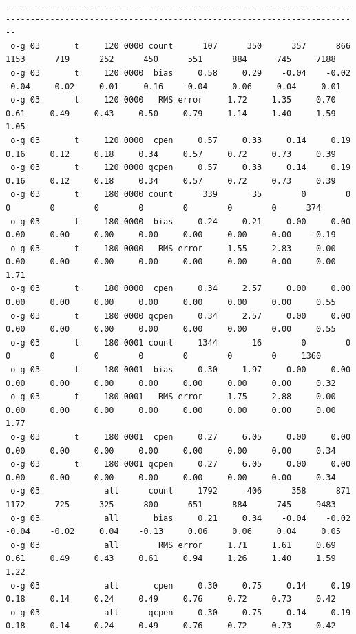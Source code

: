 \begin{itemize}[leftmargin=*]
\begin{tiny}
\begin{verbatim}
----------------------------------------------------------------------------------------------------------------------------------------------
 o-g 03       t     120 0000 count      107      350      357      866     1153      719      252      450      551      884      745     7188
 o-g 03       t     120 0000  bias     0.58     0.29    -0.04    -0.02    -0.04    -0.02     0.01    -0.16    -0.04     0.06     0.04     0.01
 o-g 03       t     120 0000   RMS error     1.72     1.35     0.70     0.61     0.49     0.43     0.50     0.79     1.14     1.40     1.59     1.05
 o-g 03       t     120 0000  cpen     0.57     0.33     0.14     0.19     0.16     0.12     0.18     0.34     0.57     0.72     0.73     0.39
 o-g 03       t     120 0000 qcpen     0.57     0.33     0.14     0.19     0.16     0.12     0.18     0.34     0.57     0.72     0.73     0.39
 o-g 03       t     180 0000 count      339       35        0        0        0        0        0        0        0        0        0      374
 o-g 03       t     180 0000  bias    -0.24     0.21     0.00     0.00     0.00     0.00     0.00     0.00     0.00     0.00     0.00    -0.19
 o-g 03       t     180 0000   RMS error     1.55     2.83     0.00     0.00     0.00     0.00     0.00     0.00     0.00     0.00     0.00     1.71
 o-g 03       t     180 0000  cpen     0.34     2.57     0.00     0.00     0.00     0.00     0.00     0.00     0.00     0.00     0.00     0.55
 o-g 03       t     180 0000 qcpen     0.34     2.57     0.00     0.00     0.00     0.00     0.00     0.00     0.00     0.00     0.00     0.55
 o-g 03       t     180 0001 count     1344       16        0        0        0        0        0        0        0        0        0     1360
 o-g 03       t     180 0001  bias     0.30     1.97     0.00     0.00     0.00     0.00     0.00     0.00     0.00     0.00     0.00     0.32
 o-g 03       t     180 0001   RMS error     1.75     2.88     0.00     0.00     0.00     0.00     0.00     0.00     0.00     0.00     0.00     1.77
 o-g 03       t     180 0001  cpen     0.27     6.05     0.00     0.00     0.00     0.00     0.00     0.00     0.00     0.00     0.00     0.34
 o-g 03       t     180 0001 qcpen     0.27     6.05     0.00     0.00     0.00     0.00     0.00     0.00     0.00     0.00     0.00     0.34
 o-g 03             all      count     1792      406      358      871     1172      725      325      800      651      884      745     9483
 o-g 03             all       bias     0.21     0.34    -0.04    -0.02    -0.04    -0.02     0.04    -0.13     0.06     0.06     0.04     0.05
 o-g 03             all        RMS error     1.71     1.61     0.69     0.61     0.49     0.43     0.61     0.94     1.26     1.40     1.59     1.22
 o-g 03             all       cpen     0.30     0.75     0.14     0.19     0.18     0.14     0.24     0.49     0.76     0.72     0.73     0.42
 o-g 03             all      qcpen     0.30     0.75     0.14     0.19     0.18     0.14     0.24     0.49     0.76     0.72     0.73     0.42
\end{verbatim}
\end{tiny}


\end{itemize}

